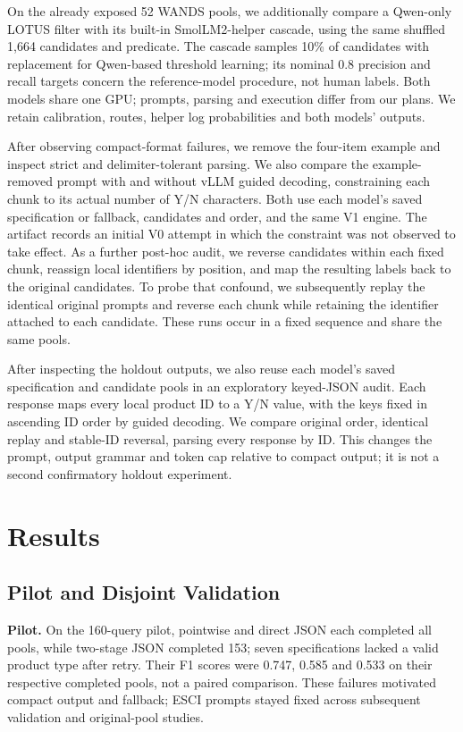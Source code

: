 \documentclass[conference]{IEEEtran}
\begin{document}
On the already exposed 52 WANDS pools, we additionally compare a Qwen-only LOTUS filter with its built-in SmolLM2-helper cascade, using the same shuffled 1,664 candidates and predicate. The cascade samples 10\% of candidates with replacement for Qwen-based threshold learning; its nominal 0.8 precision and recall targets concern the reference-model procedure, not human labels. Both models share one GPU; prompts, parsing and execution differ from our plans. We retain calibration, routes, helper log probabilities and both models' outputs.

After observing compact-format failures, we remove the four-item example and inspect strict and delimiter-tolerant parsing. We also compare the example-removed prompt with and without vLLM guided decoding, constraining each chunk to its actual number of Y/N characters. Both use each model's saved specification or fallback, candidates and order, and the same V1 engine. The artifact records an initial V0 attempt in which the constraint was not observed to take effect. As a further post-hoc audit, we reverse candidates within each fixed chunk, reassign local identifiers by position, and map the resulting labels back to the original candidates. To probe that confound, we subsequently replay the identical original prompts and reverse each chunk while retaining the identifier attached to each candidate. These runs occur in a fixed sequence and share the same pools.

After inspecting the holdout outputs, we also reuse each model's saved specification and candidate pools in an exploratory keyed-JSON audit. Each response maps every local product ID to a Y/N value, with the keys fixed in ascending ID order by guided decoding. We compare original order, identical replay and stable-ID reversal, parsing every response by ID. This changes the prompt, output grammar and token cap relative to compact output; it is not a second confirmatory holdout experiment.

\section{Results}
\subsection{Pilot and Disjoint Validation}
\textbf{Pilot.}
On the 160-query pilot, pointwise and direct JSON each completed all pools, while two-stage JSON completed 153; seven specifications lacked a valid product type after retry. Their F1 scores were 0.747, 0.585 and 0.533 on their respective completed pools, not a paired comparison. These failures motivated compact output and fallback; ESCI prompts stayed fixed across subsequent validation and original-pool studies.
\end{document}
